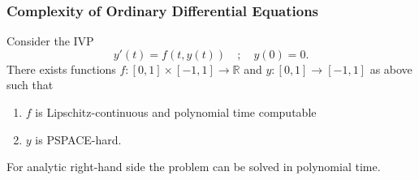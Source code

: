 \documentclass[xcolor=pdftex,dvipsnames,table]{beamer}
\newcommand{\RR}{\ensuremath{\mathbb{R}}}
\begin{document}
\begin{frame}
\frametitle{Complexity of Ordinary Differential Equations}
\begin{theorem}[Kawamura, 2010]
Consider the IVP
$$
y'(t)=f(t,y(t)) \quad;\quad y(0)=0.
$$
There exists functions $f: [0,1] \times [-1,1] \to \RR$ and  $y: [0,1] \to [-1,1]$  as above such that
\begin{enumerate}
\item $f$ is Lipschitz-continuous and polynomial time computable
\item $y$ is PSPACE-hard.
\end{enumerate}
\end{theorem}
\pause
  \begin{tcolorbox}[colback=yellow!5,colframe=red!75!black]
    \Large
    For analytic right-hand side the problem can be solved in polynomial time.
    \end{tcolorbox}
\end{frame}
\end{document}
